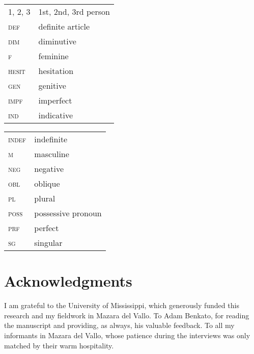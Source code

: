 \documentclass[output=paper]{langsci/langscibook}
\begin{document}
\begin{tabularx}{.45\textwidth}{lQ}
\textsc{1, 2, 3} & 1st, 2nd, 3rd person \\
\textsc{def} & definite article \\
\textsc{dim} & diminutive \\
\textsc{f} & feminine \\
\textsc{hesit} & hesitation \\
\textsc{gen} & genitive \\
\textsc{impf} & imperfect \\
\textsc{ind} & indicative \\
\end{tabularx}
\begin{tabularx}{.45\textwidth}{lQ}
\textsc{indef} & indefinite \\
\textsc{m} & masculine \\
\textsc{neg} & negative \\
\textsc{obl} & oblique \\
\textsc{pl} & plural \\
\textsc{poss} & possessive pronoun \\
\textsc{prf} & perfect \\
\textsc{sg} & singular \\
\end{tabularx}

\section*{Acknowledgments}
I am grateful to the University of Mississippi, which generously funded this research and my fieldwork in Mazara del Vallo. To Adam Benkato, for reading the manuscript and providing, as always, his valuable feedback. To all my informants in Mazara del Vallo, whose patience during the interviews was only matched by their warm hospitality.



\sloppy\printbibliography[heading=subbibliography,notkeyword=this]
\end{document}
